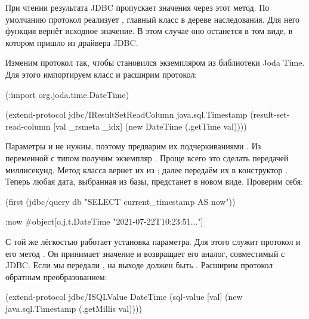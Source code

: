 При чтении результата JDBC пропускает значения через этот метод. По умолчанию протокол реализует , главный класс в дереве наследования. Для него функция  вернёт исходное значение. В этом случае оно останется в том виде, в котором пришло из драйвера JDBC.

Изменим протокол так, чтобы  становился экземпляром  из библиотеки Joda Time. Для этого импортируем класс и расширим протокол:

\begin{english}
  \begin{clojure/lines}
(:import org.joda.time.DateTime)

(extend-protocol jdbc/IResultSetReadColumn
  java.sql.Timestamp
  (result-set-read-column [val _rsmeta _idx]
    (new DateTime (.getTime val))))
  \end{clojure/lines}
\end{english}

Параметры  и  не нужны, поэтому предварим их подчеркиваниями . Из переменной  с типом  получим экземпляр . Проще всего это сделать передачей миллисекунд. Метод  класса  вернет их из ; далее передаём их в конструктор . Теперь любая дата, выбранная из базы, предстанет в новом виде. Проверим себя:

\begin{english}
  \begin{clojure}
(first
  (jdbc/query db "SELECT current_timestamp AS now"))

{:now #object[o.j.t.DateTime "2021-07-22T10:23:51..."]}
  \end{clojure}
\end{english}

С той же лёгкостью работает установка параметра. Для этого служит протокол  и его метод . Он принимает значение и возвращает его аналог, совместимый с JDBC. Если мы передали , на выходе должен быть . Расширим протокол обратным преобразованием:

\begin{english}
  \begin{clojure}
(extend-protocol jdbc/ISQLValue
  DateTime
  (sql-value [val]
    (new java.sql.Timestamp (.getMillis val))))
  \end{clojure}
\end{english}

